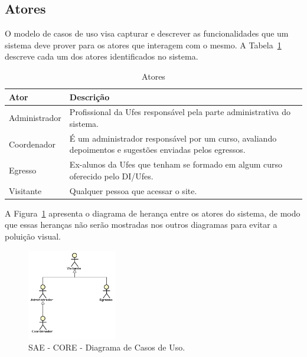 	
	
\subsection{Atores}
\label{sec-requisitos-casos-de-uso-atores}
O modelo de casos de uso visa capturar e descrever as funcionalidades que um sistema deve prover para os atores que interagem com o mesmo. A Tabela~\ref{tabela-atores} descreve cada um dos atores identificados no sistema.


	
\begin{table}[h]
	\centering \vspace{0.5cm} \caption{ Atores}
	\begin{tabular}{|p{3cm}|p{12cm}|} \hline \rowcolor[rgb]{0.8,0.8,0.8}
 		Ator & Descrição \\\hline                              
		Administrador & Profissional da Ufes responsável pela parte administrativa do sistema. \\\hline   
		Coordenador & É um administrador responsável por um curso, avaliando depoimentos e sugestões enviadas pelos egressos. \\\hline                              
		Egresso & Ex-alunos da Ufes que tenham se formado em algum curso oferecido pelo DI/Ufes. \\\hline                              
		Visitante & Qualquer pessoa que acessar o site. \\\hline 		 
	\end{tabular}
	\label{tabela-atores}	
\end{table}

	
A Figura~\ref{fig-requisitos-diagrama-atores} apresenta o diagrama de herança entre os atores do sistema, de modo que essas heranças não serão mostradas nos outros diagramas para evitar a poluição visual.
\begin{figure}[h]
	\centering
	\includegraphics[width=0.35\textwidth]{figuras/requisitos/atoresHeranca}
	\caption{SAE - CORE - Diagrama de Casos de Uso.}
	\label{fig-requisitos-diagrama-atores}
\end{figure}

